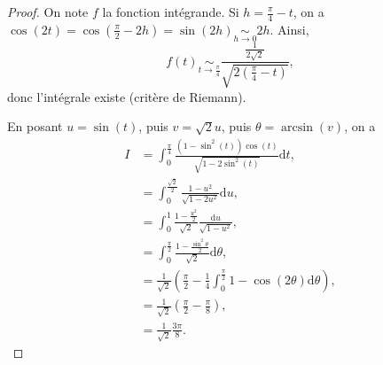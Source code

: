 \begin{proof}
    On note $f$ la fonction intégrande. Si $h=\frac{\pi}{4}-t$, on a $\cos(2t)=\cos\left(\frac{\pi}{2}-2h\right)=\sin(2h)\underset{h\to0}{\sim}2h$. Ainsi, 
    \begin{equation}
        f(t)\underset{t\to\frac{\pi}{4}}{\sim}\frac{\frac{1}{2\sqrt{2}}}{\sqrt{2\left(\frac{\pi}{4}-t\right)}},
    \end{equation}
    donc l'intégrale existe (critère de Riemann).

    En posant $u=\sin(t)$, puis $v=\sqrt{2}u$, puis $\theta=\arcsin(v)$, on a 
    \begin{align}
        I
        &= \int_{0}^{\frac{\pi}{4}}\frac{\left(1-\sin^{2}(t)\right)\cos(t)}{\sqrt{1-2\sin^{2}(t)}}\mathrm{d}t,\\
        &= \int_{0}^{\frac{\sqrt{2}}{2}}\frac{1-u^{2}}{\sqrt{1-2u^{2}}}\mathrm{d}u,\\
        &= \int_{0}^{1}\frac{1-\frac{u^{2}}{2}}{\sqrt{2}}\frac{\mathrm{d}u}{\sqrt{1-u^{2}}},\\
        &= \int_{0}^{\frac{\pi}{2}}\frac{1-\frac{\sin^{2}\theta}{2}}{\sqrt{2}}\mathrm{d}\theta,\\
        &= \frac{1}{\sqrt{2}}\left(\frac{\pi}{2}-\frac{1}{4}\int_{0}^{\frac{\pi}{2}}1-\cos(2\theta)\mathrm{d}\theta\right),\\
        &=\frac{1}{\sqrt{2}}\left(\frac{\pi}{2}-\frac{\pi}{8}\right),\\
        &=\frac{1}{\sqrt{2}}\frac{3\pi}{8}.
    \end{align}
\end{proof}

